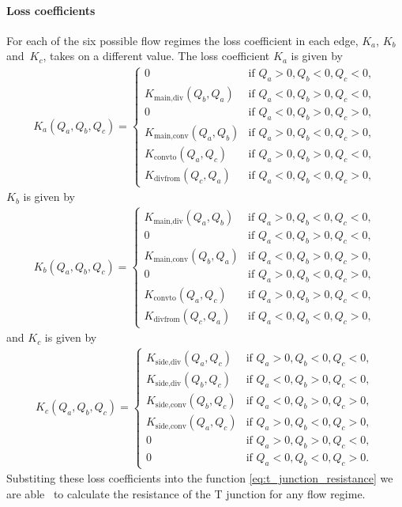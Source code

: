 \paragraph{Loss coefficients}

For each of the six possible flow regimes the loss coefficient in each edge, $K_a$, $K_b$ and\
$K_c$, takes on a different value. The loss coefficient $K_a$ is given by 
\begin{align} \label{eq:K_a}
    \boxed{ K_a(Q_a, Q_b, Q_c) = \begin{cases}
        0 & \text{if } Q_a > 0, Q_b < 0, Q_c < 0, \\
        K_{\text{main,div}}(Q_b, Q_a) & \text{if } Q_a < 0, Q_b > 0, Q_c < 0, \\
        0 & \text{if } Q_a < 0, Q_b > 0, Q_c > 0, \\
        K_{\text{main,conv}}(Q_a, Q_b) & \text{if } Q_a > 0, Q_b < 0, Q_c > 0, \\
        K_{\text{convto}}(Q_a, Q_c) & \text{if } Q_a > 0, Q_b > 0, Q_c < 0, \\
        K_{\text{divfrom}}(Q_c, Q_a) & \text{if } Q_a < 0, Q_b < 0, Q_c > 0,
    \end{cases} }
\end{align}
$K_b$ is given by
\begin{align} \label{eq:K_b}
    \boxed{ K_b(Q_a, Q_b, Q_c) = \begin{cases}
        K_{\text{main,div}}(Q_a, Q_b) & \text{if } Q_a > 0, Q_b < 0, Q_c < 0, \\
        0 & \text{if } Q_a < 0, Q_b > 0, Q_c < 0, \\
        K_{\text{main,conv}}(Q_b, Q_a) & \text{if } Q_a < 0, Q_b > 0, Q_c > 0, \\
        0 & \text{if } Q_a > 0, Q_b < 0, Q_c > 0, \\
        K_{\text{convto}}(Q_a, Q_c) & \text{if } Q_a > 0, Q_b > 0, Q_c < 0, \\
        K_{\text{divfrom}}(Q_c, Q_a) & \text{if } Q_a < 0, Q_b < 0, Q_c > 0,
    \end{cases} }
\end{align}
and $K_c$ is given by
\begin{align} \label{eq:K_c}
    \boxed{ K_c(Q_a, Q_b, Q_c) = \begin{cases}
        K_{\text{side,div}}(Q_a, Q_c) & \text{if } Q_a > 0, Q_b < 0, Q_c < 0, \\
        K_{\text{side,div}}(Q_b, Q_c) & \text{if } Q_a < 0, Q_b > 0, Q_c < 0, \\
        K_{\text{side,conv}}(Q_b, Q_c) & \text{if } Q_a < 0, Q_b > 0, Q_c > 0, \\
        K_{\text{side,conv}}(Q_a, Q_c) & \text{if } Q_a > 0, Q_b < 0, Q_c > 0, \\
        0 & \text{if } Q_a > 0, Q_b > 0, Q_c < 0, \\
        0 & \text{if } Q_a < 0, Q_b < 0, Q_c > 0.
    \end{cases} }
\end{align}
Substiting these loss coefficients into the function \eqref{eq:t_junction_resistance} we are able \ 
to calculate the resistance of the T junction for any flow regime.

